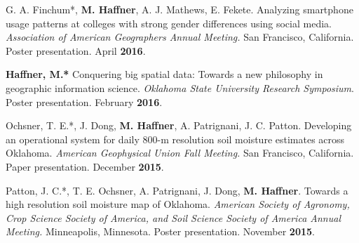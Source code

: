 \begin{cventries}
   \cventry
      {}
      {}
      {}
      {}
      {
        \begin{cvitems}
          \vspace{-2mm}
        \item G. A. Finchum*, {\textbf{M. Haffner}, A. J. Mathews, E. Fekete.
            Analyzing smartphone usage patterns at colleges with strong gender
            differences using social media. \textit{Association of American
              Geographers Annual Meeting.} San Francisco, California. Poster
            presentation. April \textbf{2016}.}
            \end{cvitems}
            }

   \cventry
      {}
      {}
      {}
      {}
      {
        \begin{cvitems}
          \vspace{-2mm}
        \item {\textbf{Haffner, M.*} Conquering big spatial data: Towards a new
            philosophy in geographic information science. \textit{Oklahoma State
              University Research Symposium}. Poster presentation. February
            \textbf{2016}.}
              \end{cvitems}
            }

   \cventry
      {}
      {}
      {}
      {}
      {
        \begin{cvitems}
          \vspace{-2mm}
        \item {Ochsner, T. E.*, J. Dong, \textbf{M. Haffner}, A. Patrignani, J.
            C. Patton. Developing an operational system for daily 800-m
            resolution soil moisture estimates across Oklahoma. \textit{American
              Geophysical Union Fall Meeting.} San Francisco, California. Paper
            presentation. December \textbf{2015}.}
            \end{cvitems}
            }

   \cventry
      {}
      {}
      {}
      {}
      {
        \begin{cvitems}
          \vspace{-2mm}
        \item {Patton, J. C.*, T. E. Ochsner, A. Patrignani, J. Dong, \textbf{M.
              Haffner}. Towards a high resolution soil moisture map of Oklahoma.
            \textit{American Society of Agronomy, Crop Science Society of
              America, and Soil Science Society of America Annual Meeting.}
            Minneapolis, Minnesota. Poster presentation. November
            \textbf{2015}.}
            \end{cvitems}
            }


\end{cventries}
